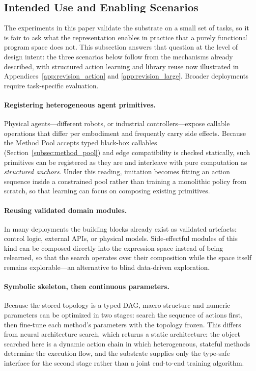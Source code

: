 \subsection{Intended Use and Enabling Scenarios}
\label{app:intended_use}

The experiments in this paper validate the substrate on a small set of tasks, so it is fair to ask what the representation enables in practice that a purely functional program space does not. This subsection answers that question at the level of design intent: the three scenarios below follow from the mechanisms already described, with structured action learning and library reuse now illustrated in Appendices~\ref{app:revision_action} and \ref{app:revision_large}. Broader deployments require task-specific evaluation.

\paragraph{Registering heterogeneous agent primitives.}
Physical agents---different robots, or industrial controllers---expose callable operations that differ per embodiment and frequently carry side effects. Because the Method Pool accepts typed black-box callables (Section~\ref{subsec:method_pool}) and edge compatibility is checked statically, such primitives can be registered as they are and interleave with pure computation as \emph{structured anchors}. Under this reading, imitation becomes fitting an action sequence inside a constrained pool rather than training a monolithic policy from scratch, so that learning can focus on composing existing primitives.

\paragraph{Reusing validated domain modules.}
In many deployments the building blocks already exist as validated artefacts: control logic, external APIs, or physical models. Side-effectful modules of this kind can be composed directly into the expression space instead of being relearned, so that the search operates over their composition while the space itself remains explorable---an alternative to blind data-driven exploration.

\paragraph{Symbolic skeleton, then continuous parameters.}
Because the stored topology is a typed DAG, macro structure and numeric parameters can be optimized in two stages: search the sequence of actions first, then fine-tune each method's parameters with the topology frozen. This differs from neural architecture search, which returns a static architecture: the object searched here is a dynamic action chain in which heterogeneous, stateful methods determine the execution flow, and the substrate supplies only the type-safe interface for the second stage rather than a joint end-to-end training algorithm.

